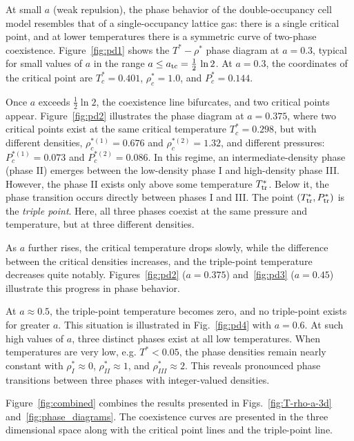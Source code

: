 \documentclass[pdflatex,sn-mathphys-num]{sn-jnl}%
\theoremstyle{thmstyleone}%
\theoremstyle{thmstyletwo}%
\theoremstyle{thmstylethree}%
\begin{document}
	At small $a$ (weak repulsion), the phase behavior of the double-occupancy cell model resembles that of a single-occupancy lattice gas: there is a single critical point, and at lower temperatures there is a symmetric curve of two-phase coexistence. Figure~\ref{fig:pd1} shows the $T^* - \rho^*$ phase diagram at $a=0.3$, typical for small values of $a$ in the range $a \leq a_{\rm tc}= \frac{1}{2}\,\ln 2$. At $a=0.3$, the coordinates of the critical point are $T^*_c = 0.401$, $\rho^*_c=1.0$, and $P^*_c=0.144$.
	
	Once $a$ exceeds $\frac{1}{2}\ln 2$, the coexistence line bifurcates, and two critical points appear. Figure~\ref{fig:pd2} illustrates the phase diagram at $a=0.375$, where two critical points exist at the same critical temperature $T^*_c = 0.298$, but with different densities, $\rho^{*(1)}_c = 0.676$ and $\rho^{*(2)}_c=1.32$, and different pressures: $P^{*(1)}_c=0.073$ and $P^{*(2)}_c=0.086$.
	In this regime, an intermediate-density phase (phase II) emerges  between the low-density phase I and high-density phase III. However, the phase II exists only above some temperature $T^*_{\rm tr}$. Below it, the phase transition occurs directly between phases I and III. The point $(T^*_{\rm tr}, P^*_{\rm tr})$ is the \textit{triple point}. Here, all three phases coexist at the same pressure and temperature, but at three different densities.
	
	As $a$ further rises, the critical temperature drops slowly, while the difference between the critical densities increases, and the triple-point temperature decreases quite notably. Figures~\ref{fig:pd2} ($a=0.375$) and~\ref{fig:pd3} ($a=0.45$) illustrate this progress in phase behavior.
	
	At $a \approx 0.5$, the triple-point temperature becomes zero, and no triple-point exists for greater $a$. This situation is illustrated in Fig.~\ref{fig:pd4} with $a=0.6$. At such high values of $a$, three distinct phases exist at all low temperatures. When temperatures are very low, e.g. $T^* < 0.05$, the phase densities remain nearly constant with $\rho^*_{I} \approx 0$, $\rho^*_{II} \approx 1$, and $\rho^*_{III} \approx 2$. This reveals pronounced phase transitions between three phases with integer-valued densities.
	
	Figure~\ref{fig:combined}  combines the results presented in Figs.~\ref{fig:T-rho-a-3d} and~\ref{fig:phase_diagrams}. The coexistence curves are presented in the three dimensional space along with the critical point lines and the triple-point line.
	
\end{document}
